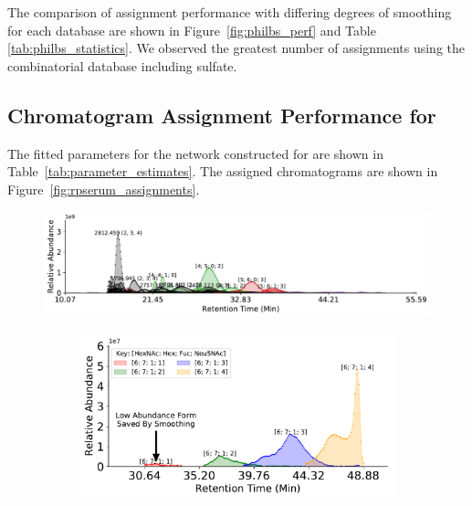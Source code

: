     The comparison of assignment performance with differing degrees of smoothing for each database
    are shown in Figure~\ref{fig:philbs_perf} and Table \ref{tab:philbs_statistics}. We observed the
    greatest number of assignments using the combinatorial database including sulfate.

\subsection{Chromatogram Assignment Performance for \rpserum}
    The fitted parameters for the network constructed for \rpserum are shown in
    Table~\ref{tab:parameter_estimates}. The assigned chromatograms are shown in
    Figure~\ref{fig:rpserum_assignments}.

    \begin{figure}[tb]
        \centering
        \begin{minipage}{1\linewidth}
            \centering
            \includegraphics[width=1\linewidth, valign=t]{figure/rp_serum_chromatograms.pdf}
            \subcaption{
                \label{fig:rpserum_assignment:a}
            }
        \end{minipage}
        \begin{minipage}{1\linewidth}
            \centering
            \begin{subfigure}[t]{0.49\linewidth}
                \includegraphics[width=1\linewidth, valign=b]{figure/fucosylated_tetra_antennary_structures.pdf}

\end{subfigure}
\end{minipage}
\end{figure}
